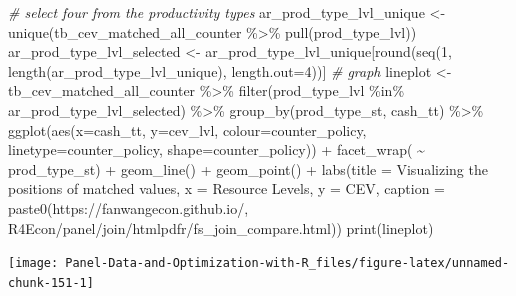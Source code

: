 \documentclass[
]{book}
\newenvironment{Shaded}{\begin{snugshade}}{\end{snugshade}}
\newcommand{\AttributeTok}[1]{\textcolor[rgb]{0.77,0.63,0.00}{#1}}
\newcommand{\CommentTok}[1]{\textcolor[rgb]{0.56,0.35,0.01}{\textit{#1}}}
\newcommand{\DecValTok}[1]{\textcolor[rgb]{0.00,0.00,0.81}{#1}}
\newcommand{\FunctionTok}[1]{\textcolor[rgb]{0.00,0.00,0.00}{#1}}
\newcommand{\NormalTok}[1]{#1}
\newcommand{\OtherTok}[1]{\textcolor[rgb]{0.56,0.35,0.01}{#1}}
\newcommand{\SpecialCharTok}[1]{\textcolor[rgb]{0.00,0.00,0.00}{#1}}
\newcommand{\StringTok}[1]{\textcolor[rgb]{0.31,0.60,0.02}{#1}}
\begin{document}
\begin{Shaded}
\begin{Highlighting}[]
\CommentTok{\# select four from the productivity types}
\NormalTok{ar\_prod\_type\_lvl\_unique }\OtherTok{\textless{}{-}} \FunctionTok{unique}\NormalTok{(tb\_cev\_matched\_all\_counter }\SpecialCharTok{\%\textgreater{}\%} \FunctionTok{pull}\NormalTok{(prod\_type\_lvl))}
\NormalTok{ar\_prod\_type\_lvl\_selected }\OtherTok{\textless{}{-}}\NormalTok{ ar\_prod\_type\_lvl\_unique[}\FunctionTok{round}\NormalTok{(}\FunctionTok{seq}\NormalTok{(}\DecValTok{1}\NormalTok{, }\FunctionTok{length}\NormalTok{(ar\_prod\_type\_lvl\_unique), }\AttributeTok{length.out=}\DecValTok{4}\NormalTok{))]}
\CommentTok{\# graph}
\NormalTok{lineplot }\OtherTok{\textless{}{-}}\NormalTok{ tb\_cev\_matched\_all\_counter }\SpecialCharTok{\%\textgreater{}\%}
    \FunctionTok{filter}\NormalTok{(prod\_type\_lvl }\SpecialCharTok{\%in\%}\NormalTok{ ar\_prod\_type\_lvl\_selected) }\SpecialCharTok{\%\textgreater{}\%}
    \FunctionTok{group\_by}\NormalTok{(prod\_type\_st, cash\_tt) }\SpecialCharTok{\%\textgreater{}\%}
    \FunctionTok{ggplot}\NormalTok{(}\FunctionTok{aes}\NormalTok{(}\AttributeTok{x=}\NormalTok{cash\_tt, }\AttributeTok{y=}\NormalTok{cev\_lvl,}
               \AttributeTok{colour=}\NormalTok{counter\_policy, }\AttributeTok{linetype=}\NormalTok{counter\_policy, }\AttributeTok{shape=}\NormalTok{counter\_policy)) }\SpecialCharTok{+}
        \FunctionTok{facet\_wrap}\NormalTok{( }\SpecialCharTok{\textasciitilde{}}\NormalTok{ prod\_type\_st) }\SpecialCharTok{+}
        \FunctionTok{geom\_line}\NormalTok{() }\SpecialCharTok{+}
        \FunctionTok{geom\_point}\NormalTok{() }\SpecialCharTok{+}
        \FunctionTok{labs}\NormalTok{(}\AttributeTok{title =} \StringTok{\textquotesingle{}Visualizing the positions of matched values\textquotesingle{}}\NormalTok{,}
             \AttributeTok{x =} \StringTok{\textquotesingle{}Resource Levels\textquotesingle{}}\NormalTok{,}
             \AttributeTok{y =} \StringTok{\textquotesingle{}CEV\textquotesingle{}}\NormalTok{,}
             \AttributeTok{caption =} \FunctionTok{paste0}\NormalTok{(}\StringTok{\textquotesingle{}https://fanwangecon.github.io/\textquotesingle{}}\NormalTok{,}
                              \StringTok{\textquotesingle{}R4Econ/panel/join/htmlpdfr/fs\_join\_compare.html\textquotesingle{}}\NormalTok{)) }
\FunctionTok{print}\NormalTok{(lineplot)}
\end{Highlighting}
\end{Shaded}

\begin{center}\texttt{[image: Panel-Data-and-Optimization-with-R\_files/figure-latex/unnamed-chunk-151-1]} \end{center}
\end{document}
